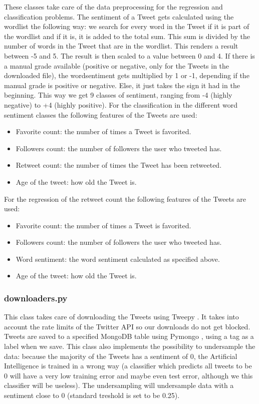 \documentclass[10pt]{IEEEtran}
\begin{document}
These classes take care of the data preprocessing for the regression and classification problems. 
The sentiment of a Tweet gets calculated using the wordlist the following way: we search for every word in the Tweet if it is part of the wordlist and if it is, it is added to the total sum. This sum is divided by the number of words in the Tweet that are in the wordlist. This renders a result between -5 and 5. The result is then scaled to a value between 0 and 4. If there is a manual grade available (positive or negative, only for the Tweets in the downloaded file), the wordsentiment gets multiplied by 1 or -1, depending if the manual grade is positive or negative. Else, it just takes the sign it had in the beginning. This way we get 9 classes of sentiment, ranging from -4 (highly negative) to +4 (highly positive). 
For the classification in the different word sentiment classes the following features of the Tweets are used:
\begin{itemize}
	\item Favorite count: the number of times a Tweet is favorited.
	\item Followers count: the number of followers the user who tweeted has.
	\item Retweet count: the number of times the Tweet has been retweeted.
	\item Age of the tweet: how old the Tweet is.
\end{itemize}

For the regression of the retweet count the following features of the Tweets are used:
\begin{itemize}
	\item Favorite count: the number of times a Tweet is favorited.
	\item Followers count: the number of followers the user who tweeted has.
	\item Word sentiment: the word sentiment calculated as specified above.
	\item Age of the tweet: how old the Tweet is.
\end{itemize}

\subsubsection{downloaders.py}

This class takes care of downloading the Tweets using Tweepy \cite{tweepy}. It takes into account the rate limits of the Twitter API so our downloads do not get blocked. Tweets are saved to a specified MongoDB table using Pymongo \cite{pymongo}, using a tag as a label when we save. This class also implements the possibility to undersample the data: because the majority of the Tweets has a sentiment of 0, the Artificial Intelligence is trained in a wrong way (a classifier which predicts all tweets to be 0 will have a very low training error and maybe even test error, although we this classifier will be useless). The undersampling  will undersample data with a sentiment close to 0 (standard treshold is set to be 0.25). 
\end{document}
